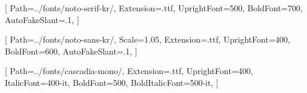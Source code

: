 \usepackage{fontspec}

\setmainfont{noto-serif-kr}[
    Path=../fonts/noto-serif-kr/,
    Extension=.ttf,
    UprightFont=500,
    BoldFont=700,
    AutoFakeSlant=.1,
]

\setsansfont{noto-sans-kr}[
    Path=../fonts/noto-sans-kr/,
    Scale=1.05,
    Extension=.ttf,
    UprightFont=400,
    BoldFont=600,
    AutoFakeSlant=.1,
]

\setmonofont{cascadia-mono}[
    Path=../fonts/cascadia-mono/,
    Extension=.ttf,
    UprightFont=400,
    ItalicFont=400-it,
    BoldFont=500,
    BoldItalicFont=500-it,
]
